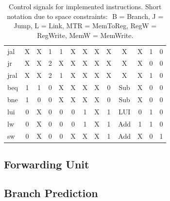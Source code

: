 \begin{table}[ht]
\begin{tabular}{|l|c|c|c|c|c|c|c|c|c|c|c|c|}
        jal        & X & X & 1 & 1 & X & X & X & X & X   & X & 1 & 0 \\
        jr         & X & X & 2 & X & X & X & X & X & X   & X & 0 & 0 \\
        jral       & X & X & 2 & 1 & X & X & X & X & X   & X & 1 & 0 \\
        \hline
        beq        & 1 & 1 & 0 & X & X & X & X & 0 & Sub & X & 0 & 0 \\
        bne        & 1 & 0 & 0 & X & X & X & X & 0 & Sub & X & 0 & 0 \\
        \hline
        lui        & 0 & X & 0 & 0 & 0 & 1 & X & 1 & LUI & 0 & 1 & 0 \\
        lw         & 0 & X & 0 & 0 & 0 & 1 & X & 1 & Add & 1 & 1 & 0 \\
        sw         & 0 & X & 0 & 0 & X & X & X & 1 & Add & X & 0 & 1 \\
        \hline
    \end{tabular}
    \caption{Control signals for implemented instructions. Short notation due to space constraints: $ $ B = Branch, J = Jump, L = Link, MTR = MemToReg, RegW = RegWrite, MemW = MemWrite.}
    \label{table:ctrlsignals}
\end{table}


\subsection{Forwarding Unit}

\subsection{Branch Prediction}

